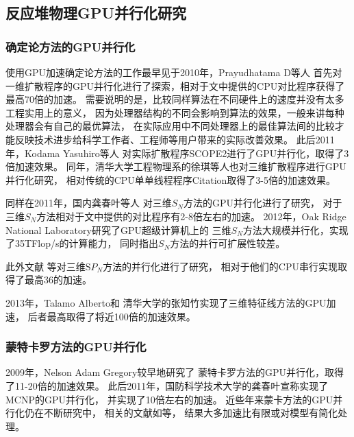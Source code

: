 \subsection{反应堆物理GPU并行化研究}

\subsubsection{确定论方法的GPU并行化}

使用GPU加速确定论方法的工作最早见于2010年，Prayudhatama D等人\cite{prayudhatama2010gpu}
首先对一维扩散程序的GPU并行化进行了探索，相对于文中提供的CPU对比程序获得了最高70倍的加速。
需要说明的是，比较同样算法在不同硬件上的速度并没有太多工程实用上的意义，
因为处理器结构的不同会影响到算法的效果，一般来讲每种处理器会有自己的最优算法，
在实际应用中不同处理器上的最佳算法间的比较才能反映技术进步给科学工作者、工程师等用户带来的实际改善效果。
此后2011年，Kodama Yasuhiro等人\cite{kodamastudy}
对实际扩散程序SCOPE2进行了GPU并行化，取得了3倍加速效果。
同年，清华大学工程物理系的徐琪等人\cite{xuqi_gpu_old}也对三维扩散程序进行GPU并行化研究，
相对传统的CPU单单线程程序Citation取得了3-5倍的加速效果。

同样在2011年，国内龚春叶等人\cite{gong2011gpu, gong2012particle, gongyechun}
对三维$S_N$方法的GPU并行化进行了研究，
对于三维$S_N$方法相对于文中提供的对比程序有2-8倍左右的加速。
2012年，Oak Ridge National Laboratory研究了\cite{baker2012high}GPU超级计算机上的
三维$S_N$方法大规模并行化，实现了35TFlop/s的计算能力，
同时指出$S_N$方法的并行可扩展性较差。

此外文献
等对三维$\mathrm{S}P_N$方法的并行化进行了研究，
相对于他们的CPU串行实现取得了最高36的加速。

2013年，Talamo Alberto\cite{talamo2013numerical}和
清华大学的张知竹\cite{zhangzhizhu}实现了三维特征线方法的GPU加速，
后者最高取得了将近100倍的加速效果。

\subsubsection{蒙特卡罗方法的GPU并行化}

2009年，Nelson Adam Gregory\cite{nelson2009monte}较早地研究了
蒙特卡罗方法的GPU并行化，取得了11-20倍的加速效果。
此后2011年，国防科学技术大学的龚春叶宣称实现了MCNP的GPU并行化\cite{gongyechun}，
并实现了10倍左右的加速。
近些年来蒙卡方法的GPU并行化仍在不断研究中，
相关的文献如等，
结果大多加速比有限或对模型有简化处理。

